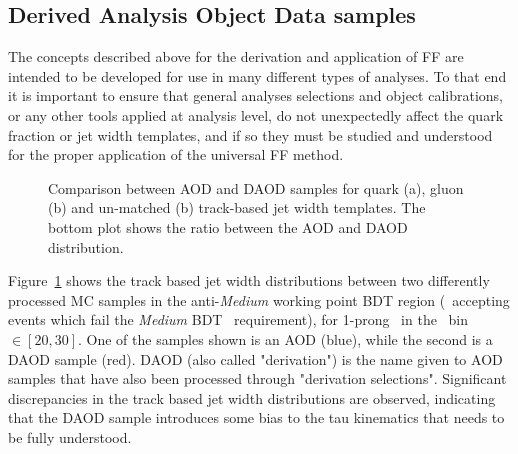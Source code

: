 	\subsection{Derived Analysis Object Data samples}
	\label{sec:DxAOD}
	
	The concepts described above for the derivation and application of \ac{FF} are intended to be developed for use in many different types of analyses. 
	To that end it is important to ensure that general analyses selections and object calibrations, or any other tools applied at analysis level, do not unexpectedly affect the quark fraction or jet width templates, and if so they must be studied and understood for the proper application of the universal \ac{FF} method.
	
	\begin{figure}[!hbt]
		\begin{center}
			\hspace{0.03\textwidth}
			\hspace{0.03\textwidth}
				\hspace{0.03\textwidth}
		\end{center}
		\caption{Comparison between AOD and DAOD samples for quark (a), gluon (b) and un-matched (b) track-based jet width templates. The bottom plot shows the ratio between the AOD and DAOD distribution.}
	\label{fig:xOAD_vs_DxAOD}
	\end{figure}	
	Figure~\ref{fig:xOAD_vs_DxAOD} shows the track based jet width distributions between two differently processed \ac{MC} samples in the anti-\textit{Medium} working point \ac{BDT} region (\ie\ accepting events which fail the \textit{Medium} \ac{BDT} \htau\ requirement), for 1-prong \htau\ in the \pt\ bin $\in[20,30]$.
	 One of the samples shown is an \ac{AOD} (blue), while the second is a \ac{DAOD} sample (red).
	\ac{DAOD} (also called "derivation") is the name given to \ac{AOD} samples that have also been processed through "derivation selections". 
	Significant discrepancies in the track based jet width distributions are observed, indicating that the \ac{DAOD} sample introduces some bias to the tau kinematics that needs to be fully understood.	
	
